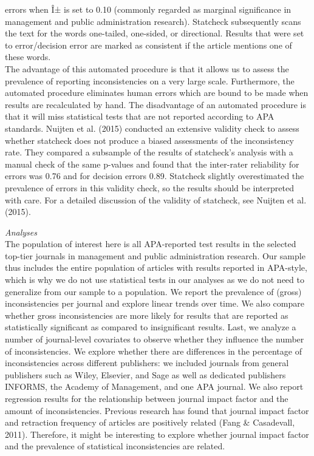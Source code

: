 \documentclass[english,man]{apa6}
\begin{document}
errors when Î± is set to 0.10 (commonly regarded as marginal
significance in management and public administration research).
Statcheck subsequently scans the text for the words one-tailed,
one-sided, or directional. Results that were set to error/decision error
are marked as consistent if the article mentions one of these
words.\\The advantage of this automated procedure is that it allows us
to assess the prevalence of reporting inconsistencies on a very large
scale. Furthermore, the automated procedure eliminates human errors
which are bound to be made when results are recalculated by hand. The
disadvantage of an automated procedure is that it will miss statistical
tests that are not reported according to APA standards. Nuijten et al.
(2015) conducted an extensive validity check to assess whether statcheck
does not produce a biased assessments of the inconsistency rate. They
compared a subsample of the results of statcheck's analysis with a
manual check of the same p-values and found that the inter-rater
reliability for errors was 0.76 and for decision errors 0.89. Statcheck
slightly overestimated the prevalence of errors in this validity check,
so the results should be interpreted with care. For a detailed
discussion of the validity of statcheck, see Nuijten et al. (2015).

\emph{Analyses}\\The population of interest here is all APA-reported
test results in the selected top-tier journals in management and public
administration research. Our sample thus includes the entire population
of articles with results reported in APA-style, which is why we do not
use statistical tests in our analyses as we do not need to generalize
from our sample to a population. We report the prevalence of (gross)
inconsistencies per journal and explore linear trends over time. We also
compare whether gross inconsistencies are more likely for results that
are reported as statistically significant as compared to insignificant
results. Last, we analyze a number of journal-level covariates to
observe whether they influence the number of inconsistencies. We explore
whether there are differences in the percentage of inconsistencies
across different publishers: we included journals from general
publishers such as Wiley, Elsevier, and Sage as well as dedicated
publishers INFORMS, the Academy of Management, and one APA journal. We
also report regression results for the relationship between journal
impact factor and the amount of inconsistencies. Previous research has
found that journal impact factor and retraction frequency of articles
are positively related (Fang \& Casadevall, 2011). Therefore, it might
be interesting to explore whether journal impact factor and the
prevalence of statistical inconsistencies are related.
\end{document}

